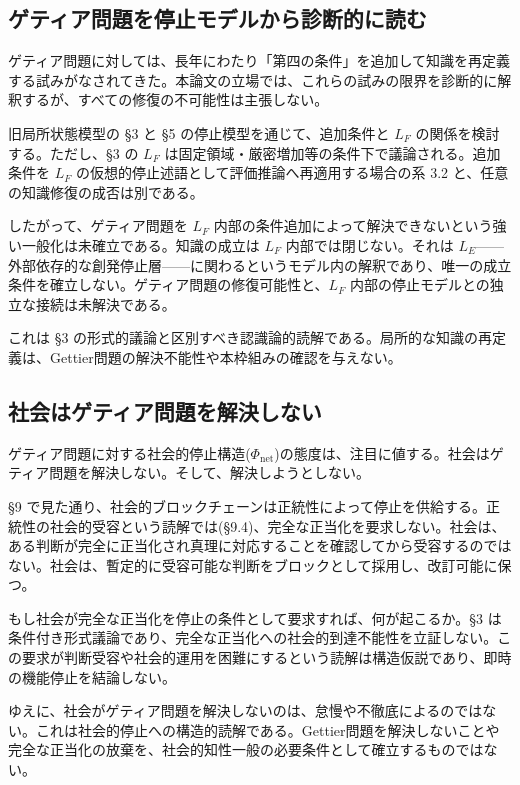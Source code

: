 \bigskip


\subsection{ゲティア問題を停止モデルから診断的に読む}


ゲティア問題に対しては、長年にわたり「第四の条件」を追加して知識を再定義する試みがなされてきた。本論文の立場では、これらの試みの限界を診断的に解釈するが、すべての修復の不可能性は主張しない。

旧局所状態模型の \S{}3 と \S{}5 の停止模型を通じて、追加条件と $L_F$ の関係を検討する。ただし、\S{}3 の $L_F$ は固定領域・厳密増加等の条件下で議論される。追加条件を $L_F$ の仮想的停止述語として評価推論へ再適用する場合の系 3.2 と、任意の知識修復の成否は別である。

したがって、ゲティア問題を $L_F$ 内部の条件追加によって解決できないという強い一般化は未確立である。知識の成立は $L_F$ 内部では閉じない。それは $L_E$——外部依存的な創発停止層——に関わるというモデル内の解釈であり、唯一の成立条件を確立しない。ゲティア問題の修復可能性と、$L_F$ 内部の停止モデルとの独立な接続は未解決である。

これは \S{}3 の形式的議論と区別すべき認識論的読解である。局所的な知識の再定義は、Gettier問題の解決不能性や本枠組みの確認を与えない。

\bigskip


\subsection{社会はゲティア問題を解決しない}


ゲティア問題に対する社会的停止構造($\Phi_{\text{net}}$)の態度は、注目に値する。社会はゲティア問題を解決しない。そして、解決しようとしない。

\S{}9 で見た通り、社会的ブロックチェーンは正統性によって停止を供給する。正統性の社会的受容という読解では(\S{}9.4)、完全な正当化を要求しない。社会は、ある判断が完全に正当化され真理に対応することを確認してから受容するのではない。社会は、暫定的に受容可能な判断をブロックとして採用し、改訂可能に保つ。

もし社会が完全な正当化を停止の条件として要求すれば、何が起こるか。\S{}3 は条件付き形式議論であり、完全な正当化への社会的到達不能性を立証しない。この要求が判断受容や社会的運用を困難にするという読解は構造仮説であり、即時の機能停止を結論しない。

ゆえに、社会がゲティア問題を解決しないのは、怠慢や不徹底によるのではない。これは社会的停止への構造的読解である。Gettier問題を解決しないことや完全な正当化の放棄を、社会的知性一般の必要条件として確立するものではない。

